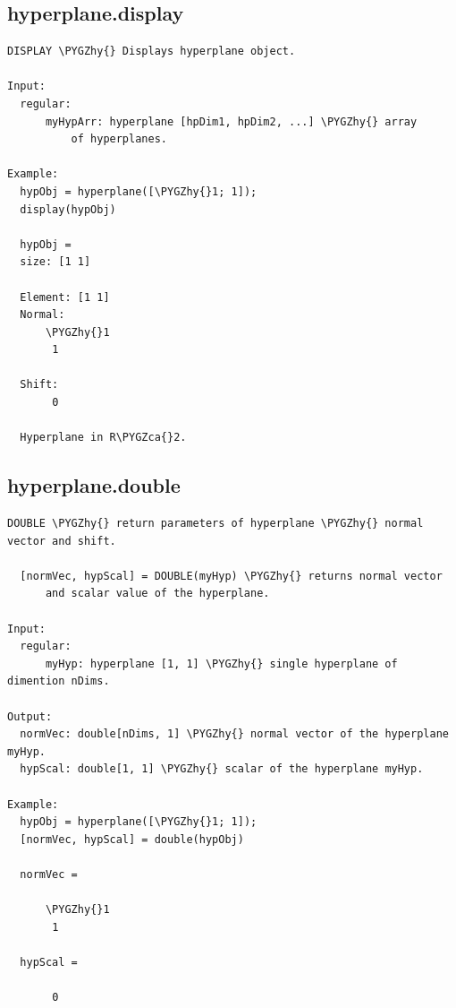 \documentclass[letterpaper,10pt,english]{sphinxmanual}
\def\PYGZca{\char`\^}
\def\PYGZhy{\char`\-}
\begin{document}
\subsection{hyperplane.display}
\label{chap_functions:hyperplane-display}
\begin{Verbatim}[commandchars=\\\{\}]
DISPLAY \PYGZhy{} Displays hyperplane object.

Input:
  regular:
      myHypArr: hyperplane [hpDim1, hpDim2, ...] \PYGZhy{} array
          of hyperplanes.

Example:
  hypObj = hyperplane([\PYGZhy{}1; 1]);
  display(hypObj)

  hypObj =
  size: [1 1]

  Element: [1 1]
  Normal:
      \PYGZhy{}1
       1

  Shift:
       0

  Hyperplane in R\PYGZca{}2.
\end{Verbatim}


\subsection{hyperplane.double}
\label{chap_functions:hyperplane-double}
\begin{Verbatim}[commandchars=\\\{\}]
DOUBLE \PYGZhy{} return parameters of hyperplane \PYGZhy{} normal vector and shift.

  [normVec, hypScal] = DOUBLE(myHyp) \PYGZhy{} returns normal vector
      and scalar value of the hyperplane.

Input:
  regular:
      myHyp: hyperplane [1, 1] \PYGZhy{} single hyperplane of dimention nDims.

Output:
  normVec: double[nDims, 1] \PYGZhy{} normal vector of the hyperplane myHyp.
  hypScal: double[1, 1] \PYGZhy{} scalar of the hyperplane myHyp.

Example:
  hypObj = hyperplane([\PYGZhy{}1; 1]);
  [normVec, hypScal] = double(hypObj)

  normVec =

      \PYGZhy{}1
       1

  hypScal =

       0
\end{Verbatim}
\end{document}
